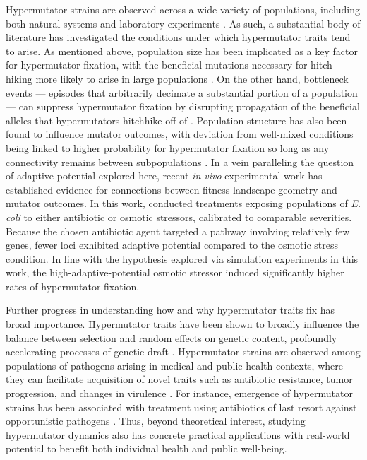 Hypermutator strains are observed across a wide variety of populations, including both natural systems and laboratory experiments \citep{sniegowski1997evolution,swings2017adaptive,maddamsetti2020divergent,cherry2018methylation}.
As such, a substantial body of literature has investigated the conditions under which hypermutator traits tend to arise.
As mentioned above, population size has been implicated as a key factor for hypermutator fixation, with the beneficial mutations necessary for hitch-hiking more likely to arise in large populations \citep{raynes2018sign}.
On the other hand, bottleneck events --- episodes that arbitrarily decimate a substantial portion of a population --- can suppress hypermutator fixation by disrupting propagation of the beneficial alleles that hypermutators hitchhike off of \citep{raynes2013effect}.
Population structure has also been found to influence mutator outcomes, with deviation from well-mixed conditions being linked to higher probability for hypermutator fixation so long as any connectivity remains between subpopulations \citep{raynes2019migration}.
In a vein paralleling the question of adaptive potential explored here, recent \textit{in vivo} experimental work has established evidence for connections between fitness landscape geometry and mutator outcomes.
In this work, \citet{callens2023hypermutator} conducted treatments exposing populations of \textit{E. coli} to either antibiotic or osmotic stressors, calibrated to comparable severities.
Because the chosen antibiotic agent targeted a pathway involving relatively few genes, fewer loci exhibited adaptive potential compared to the osmotic stress condition.
In line with the hypothesis explored via simulation experiments in this work, the high-adaptive-potential osmotic stressor induced significantly higher rates of hypermutator fixation.

Further progress in understanding how and why hypermutator traits fix has broad importance.
Hypermutator traits have been shown to broadly influence the balance between selection and random effects on genetic content, profoundly accelerating processes of genetic draft \citep{couce2017mutator}.
Hypermutator strains are observed among populations of pathogens arising in medical and public health contexts, where they can facilitate acquisition of novel traits such as antibiotic resistance, tumor progression, and changes in virulence \citep{eliopoulos2003hypermutation,jolivetgougeon2011bacterial,stern2016viral,schlesner2015hypermutation}.
For instance, emergence of hypermutator strains has been associated with treatment using antibiotics of last resort against opportunistic pathogens \citep{mehta2019essential}.
Thus, beyond theoretical interest, studying hypermutator dynamics also has concrete practical applications with real-world potential to benefit both individual health and public well-being.

